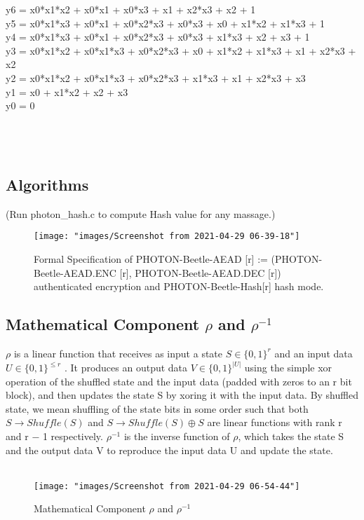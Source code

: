 \documentclass{article}
\begin{document}
y6  =  x0*x1*x2 + x0*x1 + x0*x3 + x1 + x2*x3 + x2 + 1\\
y5  =  x0*x1*x3 + x0*x1 + x0*x2*x3 + x0*x3 + x0 + x1*x2 + x1*x3 + 1\\
y4  =  x0*x1*x3 + x0*x1 + x0*x2*x3 + x0*x3 + x1*x3 + x2 + x3 + 1\\
y3  =  x0*x1*x2 + x0*x1*x3 + x0*x2*x3 + x0 + x1*x2 + x1*x3 + x1 + x2*x3 + x2\\
y2  =  x0*x1*x2 + x0*x1*x3 + x0*x2*x3 + x1*x3 + x1 + x2*x3 + x3\\
y1  =  x0 + x1*x2 + x2 + x3\\
y0  =  0\\\\\\\\
\subsection{Algorithms}
(Run photon\_hash.c to compute Hash value for any massage.)
\begin{figure}
	\centering
	\texttt{[image: "images/Screenshot from 2021-04-29 06-39-18"]}
	\caption{Formal Specification of PHOTON-Beetle-AEAD [r] := (PHOTON-Beetle-AEAD.ENC [r], PHOTON-Beetle-AEAD.DEC [r]) authenticated encryption and PHOTON-Beetle-Hash[r] hash mode.}
	\label{fig:screenshot-from-2021-04-29-06-39-18}
\end{figure}
\newpage
\subsection{Mathematical Component $\rho$ and $\rho^{-1}$}
$\rho$ is a linear function that receives as input a state $S \in \{0, 1\}^r$ and an input data $U\in \{0, 1\}^{\le r}$ . It produces an output data $V \in \{0, 1\}^{|U|}$ using the simple xor operation of the shuffled state and the input data (padded
with zeros to an r bit block), and then updates the state S by xoring it with the input data. By shuffled
state, we mean shuffling of the state bits in some order such that both $S \rightarrow Shuffle(S)$ and $S \rightarrow Shuffle(S)\oplus S$
are linear functions with rank r and r − 1 respectively. $\rho^{-1}$ is the inverse function of $\rho$, which takes the state S and the output data V to reproduce the input data U and update the state.\\\\
\begin{figure}
	\centering
	\texttt{[image: "images/Screenshot from 2021-04-29 06-54-44"]}
	\caption{Mathematical Component $\rho$ and $\rho^{-1}$}
	\label{fig:screenshot-from-2021-04-29-06-54-44}
\end{figure}
\end{document}

